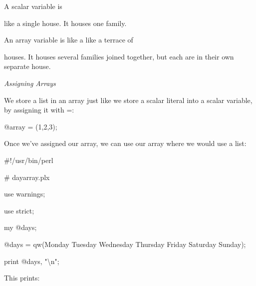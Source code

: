 \documentclass[a4paper,11pt]{book}
\begin{document}
\noindent 

\noindent 

\noindent 

\noindent A scalar variable is

\noindent like a single house. It houses one family.

\noindent An array variable is like a like a terrace of

\noindent houses. It houses several families joined together, but each are in their own separate house.

\noindent 

\noindent 

\noindent 

\noindent 

\noindent 

\noindent 

\noindent 

\noindent 

\noindent 

\noindent 

\noindent 

\noindent 

\noindent 

\noindent \textit{Assigning Arrays}

\noindent We store a list in an array just like we store a scalar literal into a scalar variable, by assigning it with =:

\noindent 

\noindent 

\noindent @array = (1,2,3);

\noindent 

\noindent Once we've assigned our array, we can use our array where we would use a list:

\noindent 

\noindent 

\noindent \#!/usr/bin/perl

\noindent \# dayarray.plx

\noindent use warnings;

\noindent use strict;

\noindent 

\noindent my @days;

\noindent @days = qw(Monday Tuesday Wednesday Thursday Friday Saturday Sunday);

\noindent print @days, "\textbackslash n";

\noindent 

\noindent This prints:
\end{document}
